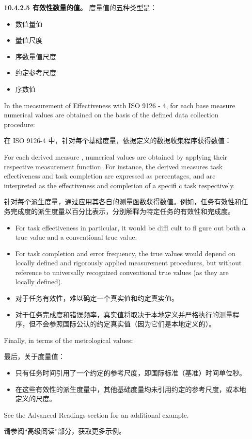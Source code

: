 \textbf{10.4.2.5 有效性数量的值。} 度量值的五种类型是：

\begin{itemize}
\item 数值量值
\item 量值尺度
\item 序数量值尺度
\item 约定参考尺度
\item 序数值
\end{itemize}

In the measurement of Effectiveness with ISO 9126 - 4, for each base measure
numerical values are obtained on the basis of the defined data collection 
procedure:

在 ISO 9126-4 中，针对每个基础度量，依据定义的数据收集程序获得数值：

For each derived measure , numerical values are obtained by applying their 
respective measurement function. For instance, the derived measures task effectiveness and task completion are expressed as percentages, and are interpreted 
as the effectiveness and completion of a specifi c task respectively.

针对每个派生度量，通过应用其各自的测量函数获得数值。例如，任务有效性和任务完成度的派生度量以百分比表示，分别解释为特定任务的有效性和完成度。

\begin{itemize}
\item For task effectiveness in particular, it would be diffi cult to fi gure out both 
a true value and a conventional true value. 
\item For task completion and error frequency, the true values would depend on 
locally defined and rigorously applied measurement procedures, but 
without reference to universally recognized conventional true values (as 
they are locally defined).
\end{itemize}

\begin{itemize}
\item 对于任务有效性，难以确定一个真实值和约定真实值。
\item 对于任务完成度和错误频率，真实值将取决于本地定义并严格执行的测量程序，但不会参照国际公认的约定真实值（因为它们是本地定义的）。
\end{itemize}

Finally, in terms of the metrological values:

最后，关于度量值：

\begin{itemize}
  \item 只有任务时间引用了一个约定的参考尺度，即国际标准（基准）时间单位秒。
  \item 在这些有效性的派生度量中，其他基础度量均未引用约定的参考尺度，或本地定义的尺度。
\end{itemize}

See the Advanced Readings section for an additional example.

请参阅“高级阅读”部分，获取更多示例。


